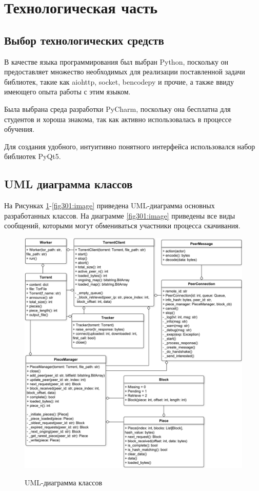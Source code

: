\section{Технологическая часть}

\subsection{Выбор технологических средств}
В качестве языка программирования был выбран Python, поскольку он предоставляет множество необходимых для реализации поставленной задачи библиотек, такие как aiohttp, socket, bencodepy и прочие, а также ввиду имеющего опыта работы с этим языком. 

Была выбрана среда разработки PyCharm, поскольку она бесплатна для студентов и хороша знакома, так как активно использовалась в процессе обучения.

Для создания удобного, интуитивно понятного интерфейса использовался набор библиотек PyQt5. \newline

\subsection{UML диаграмма классов}
На Рисунках \ref{fig300:image}-\ref{fig301:image} приведена UML-диаграмма основных разработанных классов. На диаграмме \ref{fig301:image} приведены все виды сообщений, которыми могут обмениваться участники процесса скачивания.

\newpage

\begin{figure}[h!]
	\begin{center}
		{\includegraphics[scale = 0.57]{img/uml.pdf}}
		\caption{UML-диаграмма классов}
		\label{fig300:image}
	\end{center}
\end{figure}

